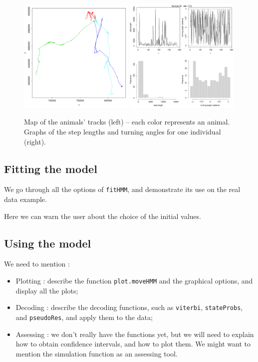 \documentclass[]{article}
\begin{document}
\begin{figure}[h]
	\includegraphics[width=0.49\textwidth]{pictures/map_moveData}
	\includegraphics[width=0.49\textwidth]{pictures/graphs_elk1}
	\caption{Map of the animals' tracks (left) -- each color represents an animal. Graphs of the step lengths and turning angles for one individual (right).}
	\label{moveData}
\end{figure}

\subsection{Fitting the model}
We go through all the options of \texttt{fitHMM}, and demonstrate its use on the real data example.

Here we can warn the user about the choice of the initial values.

\subsection{Using the model}
We need to mention :
\begin{itemize}
	\item Plotting : describe the function \texttt{plot.moveHMM} and the graphical options, and display all the plots;
	\item Decoding : describe the decoding functions, such as \texttt{viterbi}, \texttt{stateProbs}, and \texttt{pseudoRes}, and apply them to the data;
	\item Assessing : we don't really have the functions yet, but we will need to explain how to obtain confidence intervals, and how to plot them. We might want to mention the simulation function as an assessing tool.
\end{itemize}
\end{document}
